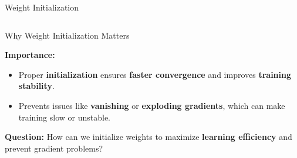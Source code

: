 \documentclass[serif, aspectratio=169]{beamer}
\begin{document}
\begin{frame}{Weight Initialization}
\begin{columns}[onlytextwidth]
    \end{columns}

\end{frame}

\begin{frame}{Why Weight Initialization Matters}

    
    \textbf{Importance:}
    \begin{itemize}
        \item Proper \textbf{initialization} ensures \textbf{faster convergence} and improves  \textbf{training stability}.
        \item Prevents issues like \textbf{vanishing} or \textbf{exploding gradients}, which can make training slow or unstable.
    \end{itemize}
    
    \textbf{Question:} How can we initialize weights to maximize \textbf{learning efficiency} and prevent gradient problems?
    
\end{frame}
\end{document}
